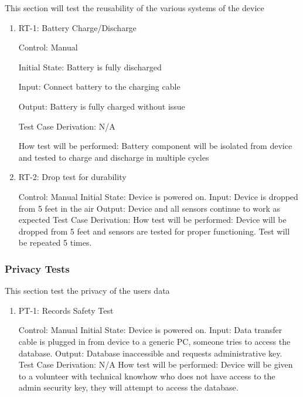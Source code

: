 \documentclass[12pt, titlepage]{article}
\begin{document}
This section will test the reusability of the various systems of the device

\begin{enumerate}

\item{RT-1: Battery Charge/Discharge\\}

Control: Manual

Initial State: Battery is fully discharged

Input: Connect battery to the charging cable 

Output: Battery is fully charged without issue

Test Case Derivation: N/A

How test will be performed: Battery component will be isolated from device and tested to charge and discharge in multiple cycles

\item{RT-2: Drop test for durability\\}

Control: Manual
Initial State: Device is powered on.
Input: Device is dropped from 5 feet in the air
Output: Device and all sensors continue to work as expected
Test Case Derivation:
How test will be performed: Device will be dropped from 5 feet and sensors are tested for proper functioning. Test will be repeated 5 times.


\end{enumerate}

\subsubsection{Privacy Tests}

This section test the privacy of the users data 

\begin{enumerate}

\item{PT-1: Records Safety Test\\}

Control: Manual
Initial State: Device is powered on.
Input: Data transfer cable is plugged in from device to a generic PC, someone tries to access the database.
Output: Database inaccessible and requests administrative key.
Test Case Derivation: N/A
How test will be performed: Device will be given to a volunteer with technical knowhow who does not have access to the admin security key, they will attempt to access the database.

\end{enumerate}
\end{document}
